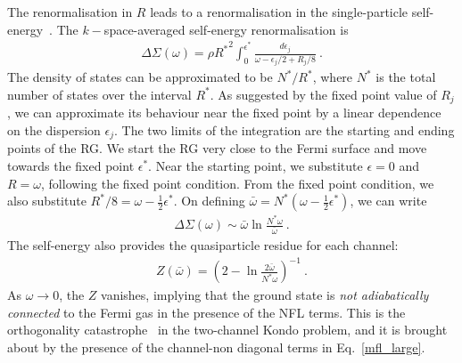 \documentclass[reprint,hidelinks,onecolumn]{revtex4-2}
\begin{document}
The renormalisation in \(R\) leads to a renormalisation in the single-particle self-energy~\cite{anirbanmott1}. The \(k-\)space-averaged self-energy renormalisation is
\begin{eqnarray}
	\Delta \Sigma(\omega) = \rho {R^*}^2\int_0^{\epsilon^*} \frac{d\epsilon_j}{\omega - \epsilon_j/2 + R_j/8}~.
\end{eqnarray}
The density of states can be approximated to be \(N^*/R^*\), where \(N^*\) is the total number of states over the interval \(R^*\). As suggested by the fixed point value of \(R_j\), we can approximate its behaviour near the fixed point by a linear dependence on the dispersion \(\epsilon_j\). The two limits of the integration are the starting and ending points of the RG. We start the RG very close to the Fermi surface and move towards the fixed point \(\epsilon^*\). Near the starting point, we substitute \(\epsilon = 0\) and \(R = \omega\), following the fixed point condition. From the fixed point condition, we also substitute \(R^*/8 = \omega - \frac{1}{2}\epsilon^*\). On defining \(\bar \omega = N^* \left(\omega - \frac{1}{2}\epsilon^*\right)\), we can write
\begin{eqnarray}
	\label{self_energy}
	\Delta \Sigma(\omega) \sim  \bar \omega \ln \frac{N^* \omega}{\bar \omega}~.
\end{eqnarray}
The self-energy also provides the quasiparticle residue for each channel\cite{anirbanmott1}:
\begin{eqnarray}
	Z(\bar\omega) = \left(2 - \ln \frac{2\bar\omega}{N^* \omega}\right) ^{-1}~.
\end{eqnarray}
As \(\omega \to 0\), the \(Z\) vanishes, implying that the ground state is {\it not adiabatically connected} to the Fermi gas in the presence of the NFL terms.
This is the orthogonality catastrophe~\cite{varma2002singular,anderson_infraredcat,yamada_catastrophe,yamada1979orthogonality} in the two-channel Kondo problem, and it is brought about by the presence of the channel-non diagonal terms in Eq.~\ref{mfl_large}.
\end{document}
